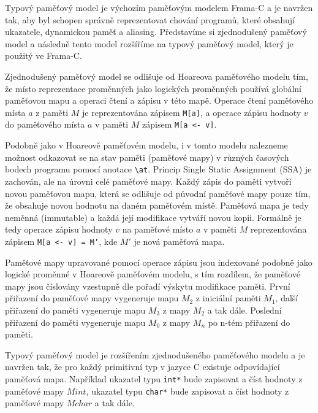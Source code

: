 Typový paměťový model je výchozím paměťovým modelem Frama\mbox{-}C
a je navržen tak, aby byl schopen správně reprezentovat chování programů,
které obsahují ukazatele, dynamickou paměť a aliasing.
Představíme si zjednodušený paměťový model a následně tento model rozšíříme na typový paměťový model,
který je použitý ve Frama\mbox{-}C\@.


Zjednodušený paměťový model se odlišuje od Hoareova paměťového modelu tím,
že místo reprezentace proměnných jako logických proměnných
používá globální paměťovou mapu a operaci čtení a zápisu v této mapě.
Operace čtení paměťového místa $a$ z paměti $M$ je reprezentována zápisem \texttt{M[a]},
a operace zápisu hodnoty $v$ do paměťového místa $a$ v paměti $M$ zápisem \texttt{M[a <- v]}.


Podobně jako v Hoareově paměťovém modelu,
i v tomto modelu nalezneme možnost odkazovat se na stav paměti (paměťové mapy)
v různých časových bodech programu pomocí anotace \texttt{\textbackslash at}.
Princip Single Static Assignment (SSA) je zachován, ale na úrovni celé paměťové mapy.
Každý zápis do paměti vytvoří novou paměťovou mapu,
která se odlišuje od původní paměťové mapy pouze tím,
že obsahuje novou hodnotu na daném paměťovém místě.
Paměťová mapa je tedy neměnná (immutable) a každá její modifikace vytváří novou kopii.
Formálně je tedy operace zápisu hodnoty $v$ na paměťové místo $a$ v paměti $M$ reprezentována zápisem
\texttt{M[a <- v] = M'}, kde $M'$ je nová paměťová mapa.

Paměťové mapy upravované pomocí operace zápisu jsou indexované podobně jako logické proměnné v Hoareově paměťovém modelu,
s tím rozdílem, že paměťové mapy jsou číslovány vzestupně dle pořadí výskytu modifikace paměti.
První přiřazení do paměťové mapy vygeneruje mapu $M_2$ z iniciální paměti $M_1$,
další přiřazení do paměti vygeneruje mapu $M_3$ z mapy $M_2$ a tak dále.
Poslední přiřazení do paměti vygeneruje mapu $M_0$ z mapy $M_n$ po n-tém přiřazení do paměti.

Typový paměťový model je rozšířením zjednodušeného paměťového modelu
a je navržen tak, že pro každý primitivní typ v jazyce C existuje odpovídající paměťová mapa.
Například ukazatel typu \texttt{int*} bude zapisovat a číst hodnoty z paměťové mapy $Mint$,
ukazatel typu \texttt{char*} bude zapisovat a číst hodnoty z paměťové mapy $Mchar$ a tak dále.

